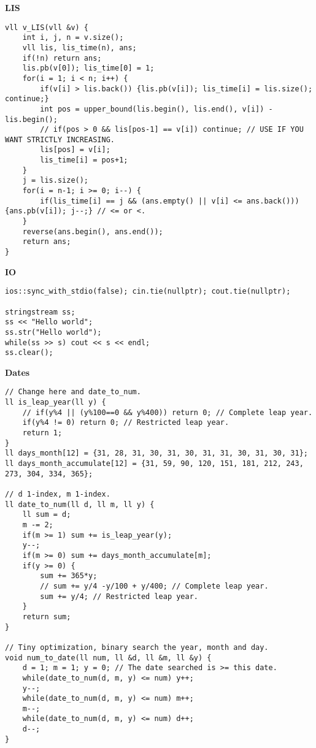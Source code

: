 \documentclass[a4paper,10pt]{article}
\newcommand{\titleAlg}[1]{\vspace{-10pt}
\begin{center}\textbf{#1}\end{center} \vspace{-10pt}}
\begin{document}
\titleAlg{LIS}
\begin{verbatim}
vll v_LIS(vll &v) {
    int i, j, n = v.size();
    vll lis, lis_time(n), ans;
    if(!n) return ans;
    lis.pb(v[0]); lis_time[0] = 1;
    for(i = 1; i < n; i++) {
        if(v[i] > lis.back()) {lis.pb(v[i]); lis_time[i] = lis.size(); continue;}
        int pos = upper_bound(lis.begin(), lis.end(), v[i]) - lis.begin();
        // if(pos > 0 && lis[pos-1] == v[i]) continue; // USE IF YOU WANT STRICTLY INCREASING.
        lis[pos] = v[i];
        lis_time[i] = pos+1;
    }
    j = lis.size();
    for(i = n-1; i >= 0; i--) {
        if(lis_time[i] == j && (ans.empty() || v[i] <= ans.back())) {ans.pb(v[i]); j--;} // <= or <.
    }
    reverse(ans.begin(), ans.end());
    return ans;
}
\end{verbatim}
\titleAlg{IO}
\begin{verbatim}
ios::sync_with_stdio(false); cin.tie(nullptr); cout.tie(nullptr);

stringstream ss;
ss << "Hello world";
ss.str("Hello world");
while(ss >> s) cout << s << endl;
ss.clear();
\end{verbatim}
\titleAlg{Dates}
\begin{multicols}{2}
\begin{verbatim}
// Change here and date_to_num.
ll is_leap_year(ll y) {
    // if(y%4 || (y%100==0 && y%400)) return 0; // Complete leap year.
    if(y%4 != 0) return 0; // Restricted leap year.
    return 1;
}
ll days_month[12] = {31, 28, 31, 30, 31, 30, 31, 31, 30, 31, 30, 31};
ll days_month_accumulate[12] = {31, 59, 90, 120, 151, 181, 212, 243, 273, 304, 334, 365};

// d 1-index, m 1-index.
ll date_to_num(ll d, ll m, ll y) {
    ll sum = d;
    m -= 2;
    if(m >= 1) sum += is_leap_year(y);
    y--;
    if(m >= 0) sum += days_month_accumulate[m];
    if(y >= 0) {
        sum += 365*y;
        // sum += y/4 -y/100 + y/400; // Complete leap year.
        sum += y/4; // Restricted leap year.
    } 
    return sum;
}

// Tiny optimization, binary search the year, month and day.
void num_to_date(ll num, ll &d, ll &m, ll &y) {
    d = 1; m = 1; y = 0; // The date searched is >= this date.
    while(date_to_num(d, m, y) <= num) y++;
    y--;
    while(date_to_num(d, m, y) <= num) m++;
    m--;
    while(date_to_num(d, m, y) <= num) d++;
    d--;
}
\end{verbatim}
\end{multicols}

\newpage
\end{document}
